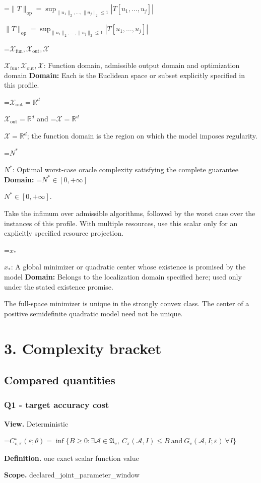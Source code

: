 \documentclass[10pt,a4paper]{article}
\newcommand{\AtlasMath}[1]{\par\begingroup\centering\setbox0=\hbox{$\displaystyle #1$}\ifdim\wd0>1.4\linewidth\typeout{ATLAS WIDE FORMULA: \the\wd0}\fi\ifdim\wd0>\linewidth\resizebox{\linewidth}{!}{\box0}\else\box0\fi\par\endgroup}
\newcommand{\AtlasInlineMath}[1]{\begingroup\setbox0=\hbox{$#1$}\ifdim\wd0>.4\linewidth\endgroup\AtlasMath{#1}\else\endgroup$#1$\fi}
\begin{document}
\AtlasInlineMath{\|T\|_{\mathrm{op}}=\sup_{\|u_1\|_2,\ldots,\|u_j\|_2\le1}|T[u_1,\ldots,u_j]|}

\AtlasInlineMath{\mathcal{X}_{\mathrm{fun}},\mathcal{X}_{\mathrm{out}},\mathcal{X}}: Function domain, admissible output domain and optimization domain \textbf{Domain:} Each is the Euclidean space or subset explicitly specified in this profile.

\AtlasInlineMath{\mathcal{X}_{\mathrm{out}}=\mathbb{R}^d} and \AtlasInlineMath{\mathcal{X}=\mathbb{R}^d}; the function domain is the region on which the model imposes regularity.

\AtlasInlineMath{N^*}: Optimal worst-case oracle complexity satisfying the complete guarantee \textbf{Domain:} \AtlasInlineMath{N^*\in[0,+\infty]}.

Take the infimum over admissible algorithms, followed by the worst case over the instances of this profile. With multiple resources, use this scalar only for an explicitly specified resource projection.

\AtlasInlineMath{x_*}: A global minimizer or quadratic center whose existence is promised by the model \textbf{Domain:} Belongs to the localization domain specified here; used only under the stated existence promise.

The full-space minimizer is unique in the strongly convex class. The center of a positive semidefinite quadratic model need not be unique.

\section{3. Complexity bracket}
\subsection{Compared quantities}
\subsubsection{Q1 - target accuracy cost}
\textbf{View.} Deterministic

\AtlasMath{C^\star_{v,\pi}(\varepsilon;\theta)=\inf\{B\ge0:\exists\mathcal A\in\mathfrak A_v,\ C_\pi(\mathcal A,I)\le B\ \text{and}\ G_v(\mathcal A,I;\varepsilon)\ \forall I\}}
\textbf{Definition.} one exact scalar function value

\textbf{Scope.} declared\_joint\_parameter\_window
\end{document}
